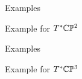 \begin{frame}{Examples}
    \begin{block}{Example for $T^{\ast}\mathbb{C}\mathbb{P}^{2}$}
        \vspace{192pt}
    \end{block}
\end{frame}

\begin{frame}{Examples}
    \begin{block}{Example for $T^{\ast}\mathbb{C}\mathbb{P}^{3}$}
        \vspace{192pt}
    \end{block}
\end{frame}